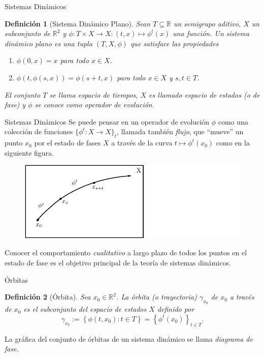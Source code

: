 \documentclass{beamer}
\newtheorem{defi}{Definición}
\renewenvironment{definition}{\begin{defi}}{\end{defi}}
\newcommand{\R}{{\ensuremath{\mathbb{R}}}}
\begin{document}
\begin{frame}{Sistemas Dinámicos}
\begin{definition}[Sistema Dinámico Plano]
Sean $T \subseteq \R$ un semigrupo aditivo, $X$ un subconjunto de $\R^2$ y $\phi: T \times X \to X: (t,x) \mapsto \phi^t(x)$ una función. Un \emph{sistema dinámico plano} es una tupla $(T, X, \phi)$ que satisface las propiedades

\begin{enumerate}[(1)]
    \item $\phi \left( 0, x \right) = x$ para todo $x \in
    X$.
    \item $\phi \left( t, \phi \left( s, x \right) \right) = \phi \left(
    s + t, x \right)$ para todo $x \in X$ y $s, t \in T$.
\end{enumerate}

El conjunto $T$ se llama \emph{espacio de tiempos}, $X$ es llamado {\emph{espacio de estados (o de fase)}} y $\phi$ se conoce como {\emph{operador de evoluci\'on}}.
\end{definition}
\end{frame}

\begin{frame}{Sistemas Dinámicos}
Se puede pensar en un operador de evolución $\phi$ como una colección de funciones $\{ \phi^t: X \to X \}_t$, llamada también \emph{flujo}, que ``mueve'' un punto $x_0$ por el estado de fases $X$ a través de la curva $t \mapsto \phi^t(x_0)$ como en la siguiente figura.

\begin{figure}[!ht] \centering
    \includegraphics[scale=0.75]{../figures/evolution-operator.pdf}
\end{figure}
\pause
Conocer el comportamiento \emph{cualitativo} a largo plazo de todos los puntos en el estado de fase es el objetivo principal de la teoría de sistemas dinámicos.
\end{frame}

\begin{frame}{Órbitas}
\begin{definition}[Órbita]
Sea $x_0 \in \R^2$. La órbita (o trayectoria) $\gamma_{x_0}$ de $x_0$ a trav\'es de $x_0$ es el subconjunto del espacio de estados $X$ definido por \[ \gamma_{x_0} := \left\{ \phi
     \left( t, x_0 \right) : t \in T \right\} = \left\{ \phi^t \left( x_0
     \right) \right\}_{t \in T} . \]
\end{definition}
\pause

La gráfica del conjunto de órbitas de un sistema dinámico se llama \emph{diagrama de fase}.
\end{frame}
\end{document}
